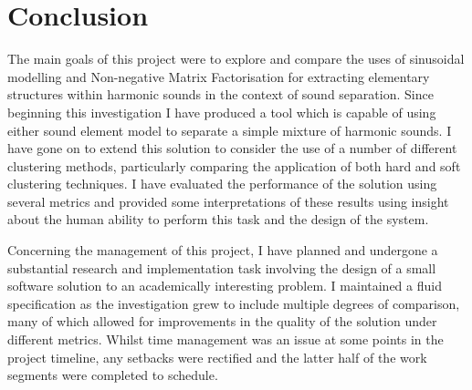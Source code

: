 \documentclass[12pt,a4paper,twoside,openright]{report}
\begin{document}




\chapter{Conclusion}


The main goals of this project were to explore and compare the uses of sinusoidal modelling and Non-negative Matrix Factorisation for extracting elementary structures within harmonic sounds in the context of sound separation. Since beginning this investigation I have produced a tool which is capable of using either sound element model to separate a simple mixture of harmonic sounds. I have gone on to extend this solution to consider the use of a number of different clustering methods, particularly comparing the application of both hard and soft clustering techniques. I have evaluated the performance of the solution using several metrics and provided some interpretations of these results using insight about the human ability to perform this task and the design of the system.



Concerning the management of this project, I have planned and undergone a substantial research and implementation task involving the design of a small software solution to an academically interesting problem. I maintained a fluid specification as the investigation grew to include multiple degrees of comparison, many of which allowed for improvements in the quality of the solution under different metrics. Whilst time management was an issue at some points in the project timeline, any setbacks were rectified and the latter half of the work segments were completed to schedule.

\end{document}
